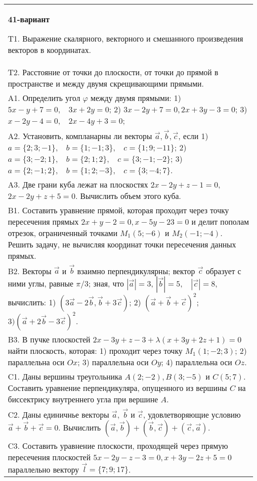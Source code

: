 \documentclass{article}
\begin{document}
\begin{tabular}{m{17cm}}
\textbf{41-вариант}
\newline

T1. 
Выражение скалярного, векторного и смешанного произведения векторов в координатах.
 \\
T2. 
Расстояние от точки до плоскости, от точки до прямой в пространстве и между двумя скрещивающими прямыми. \\
A1. 
Определить угол \(\varphi\) между двумя прямыми: 1) \(5x - y + 7 = 0,\ \ \ \ 3x + 2y = 0\); 2) \(3x - 2y + 7 = 0,2x + 3y - 3 = 0\); 3) \(x - 2y - 4 = 0,\ \ \ \ 2x - 4y + 3 = 0\);
 \\
A2. 
Установить, компланарны ли векторы \(\overrightarrow{a},\overrightarrow{b},\overrightarrow{c}\), если 1)\(a = \{ 2;3; - 1\},\ \ \ \ b = \{ 1; - 1;3\},\ \ \ \ c = \{ 1;9; - 11\}\); 2)\(a = \{ 3; - 2;1\},\ \ \ \ b = \{ 2;1;2\},\ \ \ \ c = \{ 3; - 1; - 2\}\); 3)\(a = \{ 2; - 1;2\},\ \ \ \ b = \{ 1;2; - 3\},\ \ \ \ c = \{ 3; - 4;7\}\). \\
A3. 
Две грани куба лежат на плоскостях \(2x - 2y + z - 1 = 0,\) \(2x - 2y + z + 5 = 0\). Вычислить объем этого куба.
 \\
B1. 
Составить уравнение прямой, которая проходит через точку пересечения прямых \(2x + y - 2 = 0,x - 5y - 23 = 0\) и делит пополам отрезок, ограниченный точками \(M_{1}(5; - 6)\) и \(M_{2}( - 1; - 4)\). Решить задачу, не вычисляя координат точки пересечения данных прямых.
 \\
B2. 
Векторы \(\overrightarrow{a}\) и \(\overrightarrow{b}\) взаимно перпендикулярны; вектор \(\overrightarrow{c}\) образует с ними углы, равные \(\pi/3\); зная, что \(|\overrightarrow{a}| = 3\), \(|\overrightarrow{b}| = 5,\ \ \ \ |\overrightarrow{c}| = 8\), вычислить: 1) \(\left( 3\overrightarrow{a} - 2\overrightarrow{b},\overrightarrow{b} + 3\overrightarrow{c} \right)\); 2) \((\overrightarrow{a} + \overrightarrow{b} + \overrightarrow{c})^{2};\) \(3)(\overrightarrow{a} + 2\overrightarrow{b} - 3\overrightarrow{c})^{2}\).
 \\
B3. 
В пучке плоскостей \(2x - 3y + z - 3 + \lambda(x + 3y + 2z + 1) = 0\) найти плоскость, которая: 1) проходит через точку \(M_{1}(1; - 2;3)\); 2) параллельна оси \(Ox\); 3) параллельна оси \(Oy\); 4) параллельна оси \(Oz\).
 \\
C1. 
Даны вершины треугольника \(A(2; - 2),B(3; - 5)\) и \(C(5;7)\). Составить уравнение перпендикуляра, опущенного из вершины \(C\) на биссектрису внутреннего угла при вершине \(A\).
 \\
C2. Даны единичнье векторы \(\overrightarrow{a},\ \overrightarrow{b}\) и \(\overrightarrow{c}\), удовлетворяющие условию \(\overrightarrow{a} + \overrightarrow{b} + \overrightarrow{c} = 0\). Вычислить \(\left( \overrightarrow{a},\overrightarrow{b} \right) + \left( \overrightarrow{b},\overrightarrow{c} \right) + \left( \overrightarrow{c},\overrightarrow{a} \right)\).
 \\
C3. 
Составить уравнение плоскости, проходящей через прямую пересечения плоскостей \(5x - 2y - z - 3 = 0,x + 3y - 2z + 5 = 0\) параллельно вектору \(\overrightarrow{l} = \{ 7;9;17\}\).
 \\

\end{tabular}
\end{document}
